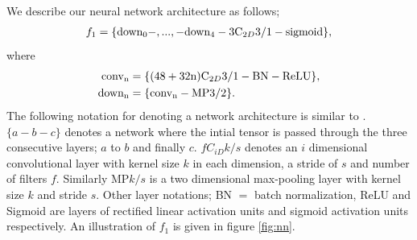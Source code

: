 \documentclass{IET}%
\begin{document}
We describe our neural network architecture as follows;
\begin{align}\label{eq:whaleconv1}
	 f_1 = \{\text{down\textsubscript{0}} - , ... , - \text{down\textsubscript{4}} - 3\text{C}_{2D}3/1 - \text{sigmoid}\}, 
\end{align}
	where 
\begin{align}
			 \text{conv\textsubscript{n}} &= \{(48 + 32\text{n})\text{C}_{2D}3/1 - \text{BN} - \text{ReLU}\}, \\	
     		 \text{down\textsubscript{n}}  &= \{\text{conv\textsubscript{n}}- \text{MP}3/2\}.
     		 \label{eq:whaleconv1block}
\end{align}
The following notation for denoting a network architecture is similar to \cite{graham2014fractional}. $\{a-b-c\}$ denotes a network where the intial tensor is passed through the three consecutive layers; $a$ to $b$ and finally $c$. $fC_{iD}k/s$ denotes an $i$ dimensional convolutional layer with kernel size $k$ in each dimension, a stride of $s$ and number of filters $f$. Similarly MP$k/s$ is a two dimensional max-pooling layer with kernel size $k$ and stride $s$. Other layer notations; BN $=$ batch normalization, ReLU and Sigmoid are layers of rectified linear activation units and sigmoid activation units respectively. An illustration of $f_1$ is given in figure \ref{fig:nn}.
\end{document}
